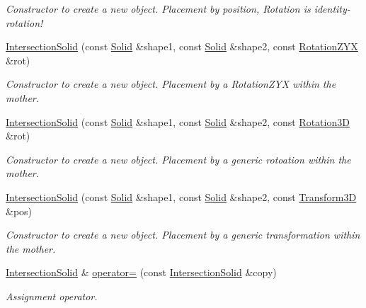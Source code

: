 \begin{DoxyCompactItemize}
\begin{DoxyCompactList}\small\item\em Constructor to create a new object. Placement by position, Rotation is identity-\/rotation! \item\end{DoxyCompactList}\item 
\hyperlink{class_d_d4hep_1_1_geometry_1_1_intersection_solid_a350b9cf8a8d458930e25341c1be6f6af}{IntersectionSolid} (const \hyperlink{class_d_d4hep_1_1_geometry_1_1_solid__type}{Solid} \&shape1, const \hyperlink{class_d_d4hep_1_1_geometry_1_1_solid__type}{Solid} \&shape2, const \hyperlink{namespace_d_d4hep_1_1_geometry_a24667b2b9c3cec3d5239828db4d52189}{RotationZYX} \&rot)
\begin{DoxyCompactList}\small\item\em Constructor to create a new object. Placement by a RotationZYX within the mother. \item\end{DoxyCompactList}\item 
\hyperlink{class_d_d4hep_1_1_geometry_1_1_intersection_solid_ae8220a5808a24ab8bacec490276ace38}{IntersectionSolid} (const \hyperlink{class_d_d4hep_1_1_geometry_1_1_solid__type}{Solid} \&shape1, const \hyperlink{class_d_d4hep_1_1_geometry_1_1_solid__type}{Solid} \&shape2, const \hyperlink{namespace_d_d4hep_1_1_geometry_a022fecb763315fa2bf39cbb648944a0e}{Rotation3D} \&rot)
\begin{DoxyCompactList}\small\item\em Constructor to create a new object. Placement by a generic rotoation within the mother. \item\end{DoxyCompactList}\item 
\hyperlink{class_d_d4hep_1_1_geometry_1_1_intersection_solid_a07ed67ab3e7435dc62ecf109475a0d8d}{IntersectionSolid} (const \hyperlink{class_d_d4hep_1_1_geometry_1_1_solid__type}{Solid} \&shape1, const \hyperlink{class_d_d4hep_1_1_geometry_1_1_solid__type}{Solid} \&shape2, const \hyperlink{namespace_d_d4hep_1_1_geometry_aeb4c0356d12fd7be49a0aae50514e64b}{Transform3D} \&pos)
\begin{DoxyCompactList}\small\item\em Constructor to create a new object. Placement by a generic transformation within the mother. \item\end{DoxyCompactList}\item 
\hyperlink{class_d_d4hep_1_1_geometry_1_1_intersection_solid}{IntersectionSolid} \& \hyperlink{class_d_d4hep_1_1_geometry_1_1_intersection_solid_a728f2962e5548d8dd9eee9dad0ec6705}{operator=} (const \hyperlink{class_d_d4hep_1_1_geometry_1_1_intersection_solid}{IntersectionSolid} \&copy)
\begin{DoxyCompactList}\small\item\em Assignment operator. \item\end{DoxyCompactList}\end{DoxyCompactItemize}


